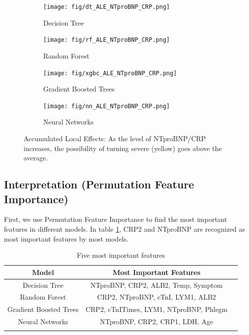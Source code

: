 
\begin{figure}
\centering
\begin{subfigure}[b]{0.485\textwidth}
    \centering
    \texttt{[image: fig/dt\_ALE\_NTproBNP\_CRP.png]}
    \caption{Decision Tree}
    \label{fig:dt_ale}
\end{subfigure}
\hfill
\begin{subfigure}[b]{0.485\textwidth}
    \centering
    \texttt{[image: fig/rf\_ALE\_NTproBNP\_CRP.png]}
    \caption{Random Forest}
    \label{fig:rf_ale}
\end{subfigure}
\hfill
\begin{subfigure}[b]{0.485\textwidth}
    \centering
    \texttt{[image: fig/xgbc\_ALE\_NTproBNP\_CRP.png]}
    \caption{Gradient Boosted Trees}
    \label{fig:gbt_ale}
\end{subfigure}
\hfill
\begin{subfigure}[b]{0.485\textwidth}
    \centering
    \texttt{[image: fig/nn\_ALE\_NTproBNP\_CRP.png]}
    \caption{Neural Networks}
    \label{fig:nn_ale}
\end{subfigure}
\caption{Accumulated Local Effects: As the level of NTproBNP/CRP increases, the possibility of turning severe (yellow) goes above the average.}
\label{fig.ale}
\end{figure}

\newpage
\subsection{\textbf{Interpretation (Permutation Feature Importance)}}

First, we use  Permutation Feature Importance to find the most important features in different models. In table \ref{tab:important_feature}, CRP2 and NTproBNP are recognized as most important features by most models.

\begin{table}[H]
\centering
\caption{Five most important features}
\begin{tabular}{@{}ccc@{}}
\toprule
Model                   & Most Important Features \\ \midrule
Decision Tree           & NTproBNP, CRP2, ALB2, Temp, Symptom      \\
Random Forest           & CRP2, NTproBNP, cTnI, LYM1, ALB2         \\
Gradient Boosted Trees  & CRP2, cTnITimes, LYM1, NTproBNP, Phlegm  \\
Neural Networks         & NTproBNP, CRP2, CRP1, LDH, Age           \\  \bottomrule
\label{tab:important_feature}
\end{tabular}
\end{table}

